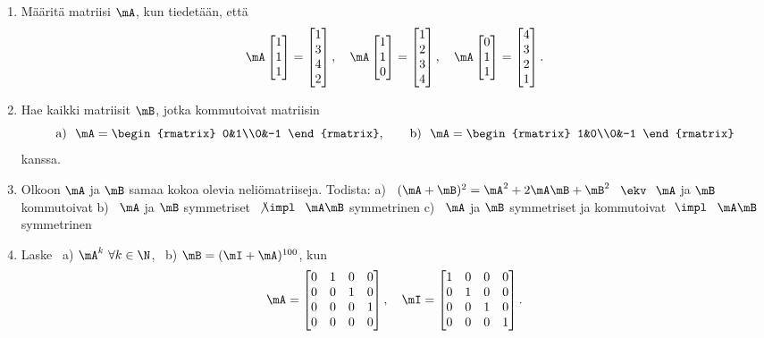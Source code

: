\begin{enumerate}
\item
Määritä matriisi $\mA$, kun tiedetään, että
\[
\mA\begin{bmatrix} 1\\1\\1 \end{bmatrix} = \begin{bmatrix} 1\\3\\4\\2 \end{bmatrix}, \quad
\mA\begin{bmatrix} 1\\1\\0 \end{bmatrix} = \begin{bmatrix} 1\\2\\3\\4 \end{bmatrix}, \quad
\mA\begin{bmatrix} 0\\1\\1 \end{bmatrix} = \begin{bmatrix} 4\\3\\2\\1 \end{bmatrix}.
\]

\item
Hae kaikki matriisit $\mB$, jotka kommutoivat matriisin
\[
\text{a)}\ \ \mA=\begin{rmatrix} 0&1\\0&-1 \end{rmatrix}, \qquad
\text{b)}\ \ \mA=\begin{rmatrix} 1&0\\0&-1 \end{rmatrix}
\]
kanssa. 

\item 
Olkoon $\mA$ ja $\mB$ samaa kokoa olevia neliömatriiseja. Todista: \vspace{1mm}\newline
a) \ $(\mA + \mB)^2=\mA^2+2\mA\mB+\mB^2$ $\ \ekv\ $ $\mA$ ja $\mB$ kommutoivat \newline
b) \ $\mA$ ja $\mB$ symmetriset $\ \not\impl\ $ $\mA\mB$ symmetrinen \newline
c) \ $\mA$ ja $\mB$ symmetriset ja kommutoivat $\ \impl\ $ $\mA\mB$ symmetrinen

\item
Laske \ a) $\mA^k\ \forall k\in\N$, \ b) $\mB=(\mI+\mA)^{100}$, kun
\[
\mA=\begin{bmatrix} 0&1&0&0\\0&0&1&0\\0&0&0&1\\0&0&0&0 \end{bmatrix}, \quad
\mI=\begin{bmatrix} 1&0&0&0\\0&1&0&0\\0&0&1&0\\0&0&0&1 \end{bmatrix}.
\]


\end{enumerate}
